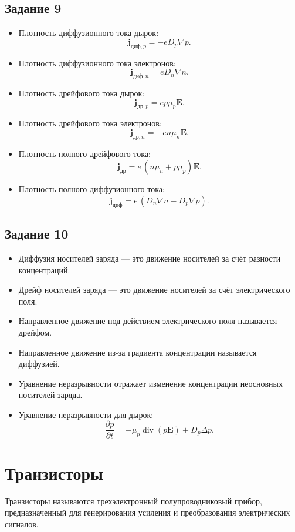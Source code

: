\documentclass[../main.tex]{subfiles}
\begin{document}
\subsection{Задание 9}
\begin{itemize}
  \item Плотность диффузионного тока дырок: $$\mathbf{j}_{\text{диф},p} = -eD_p\nabla p.$$
  \item Плотность диффузионного тока электронов: $$\mathbf{j}_{\text{диф},n} = eD_n\nabla n.$$
  \item Плотность дрейфового тока дырок: $$\mathbf{j}_{\text{др},p} = e p \mu_p \mathbf{E}.$$
  \item Плотность дрейфового тока электронов: $$\mathbf{j}_{\text{др},n} = - e n \mu_n \mathbf{E}.$$
  \item Плотность полного дрейфового тока: $$\mathbf{j}_{\text{др}} = e\,(n\mu_n + p\mu_p)\mathbf{E}.$$
  \item Плотность полного диффузионного тока: $$\mathbf{j}_{\text{диф}} = e\,(D_n\nabla n - D_p\nabla p).$$
\end{itemize}

\subsection{Задание 10}
\begin{itemize}
  \item Диффузия носителей заряда — это движение носителей за счёт разности концентраций.
  \item Дрейф носителей заряда — это движение носителей за счёт электрического поля.
  \item Направленное движение под действием электрического поля называется дрейфом.
  \item Направленное движение из-за градиента концентрации называется диффузией.
  \item Уравнение неразрывности отражает изменение концентрации неосновных носителей заряда.
  \item Уравнение неразрывности для дырок:
  $$\frac{\partial p}{\partial t} = -\mu_p \operatorname{div}(p\mathbf{E}) + D_p \Delta p.$$
\end{itemize}


\section{Транзисторы}
 Транзисторы называются трехэлектронный полупроводниковый прибор, предназначенный для генерирования усиления и преобразования 
электрических сигналов.
\end{document}
